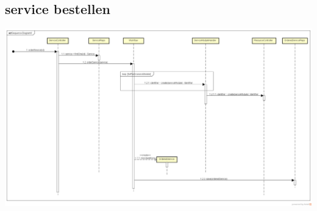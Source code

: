 \subsection{service bestellen}

\begin{center}
\includegraphics[width=\textwidth]{./05_Design/04_Architektur/orderService}
\end{center}
